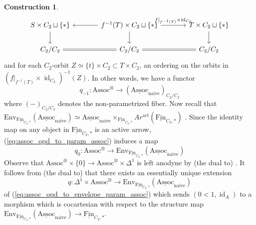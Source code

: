 \documentclass{article}
\DeclareMathOperator{\id}{id} %
\newcommand{\Assoc}{\mathrm{Assoc}}
\newcommand{\Fin}{\mathrm{Fin}} %
\theoremstyle{definition}
\newtheorem{construction}[equation]{Construction}
\begin{document}
\begin{construction}
    \begin{equation*}
    \begin{tikzcd}[column sep=large]
        S \times C_2 \sqcup \{*\} \ar[d] & f^{-1}(T) \times C_2 \sqcup \{*\} \ar[l] \ar[d] \ar[r,"{f|_{f^{-1}(T)} \times \id_{C_2}}"] & T \times C_2 \sqcup \{*\} \ar[d] \\
        C_2/C_2 & C_2/C_2 \ar[l,equals] \ar[r,equals] & C_2/C_2
    \end{tikzcd}
    \end{equation*}
    and for each $ C_2 $-orbit $ Z \simeq \{t\} \times C_2 \subset T \times C_2 $, an ordering on the orbits in $ \left(f|_{f^{-1}(T)} \times \id_{C_2}\right)^{-1}(Z) $. 
    In other words, we have a functor 
    \begin{equation}\label{eq:assoc_opd_to_param_assoc}
        q_{-1} \colon \Assoc^\otimes \to \left(\underline{\Assoc}_{\mathrm{naive}}\right)_{C_2/C_2}
    \end{equation}
    where $ (-)_{C_2/C_2} $ denotes the non-parametrized fiber. 
    Now recall that $ \mathrm{Env}_{\underline{\Fin}_{C_2,*}}(\underline{\mathrm{Assoc}}_{\mathrm{naive}}) \simeq \underline{\mathrm{Assoc}}_{\mathrm{naive}} \times_{\underline{\Fin}_{C_2,*}} Ar^{\mathrm{act}}(\underline{\Fin}_{C_2,*}) $ \cite[Definition 2.8.4]{NS22}. 
    Since the identity map on any object in $ \underline{\Fin}_{C_2,*} $ is an active arrow, (\ref{eq:assoc_opd_to_param_assoc}) induces a map
    \begin{equation}\label{eq:assoc_opd_to_envelope_param_assoc}
        q_{0} \colon \Assoc^\otimes \to \mathrm{Env}_{\underline{\Fin}_{C_2,*}}\left(\underline{\mathrm{Assoc}}_{\mathrm{naive}}\right) 
    \end{equation}
    Observe that $ \Assoc^\otimes \times \{0\} \to \Assoc^\otimes \times \Delta^1 $ is left anodyne by (the dual to) \cite[Corollary 2.1.2.7]{HTT}. 
    It follows from (the dual to) \cites[Corollary 2.4.2.5]{HTT}[\href{https://kerodon.net/tag/01VF}{Tag 01VF} Theorem 5.2.1.1(1')]{kerodon} that there exists an essentially unique extension 
    \begin{equation}\label{eq:assoc_opd_interval_to_envelope_param_assoc}
        q\colon \Delta^1 \times \Assoc^\otimes \to \mathrm{Env}_{\underline{\Fin}_{C_2,*}}\left(\underline{\mathrm{Assoc}}_{\mathrm{naive}}\right) 
    \end{equation}
    of (\ref{eq:assoc_opd_to_envelope_param_assoc}) which sends $ (0<1, \id_A) $ to a morphism which is cocartesian with respect to the structure map $ \mathrm{Env}_{\underline{\Fin}_{C_2,*}}(\underline{\mathrm{Assoc}}_{\mathrm{naive}}) \to \underline{\Fin}_{C_2,*} $. 

\end{construction}
\end{document}
